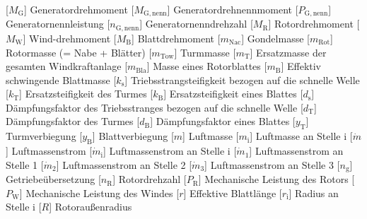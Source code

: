 \documentclass[
	pagesize,
	fontsize=12pt,
	paper=a4,
	oneside,
   reqno
]{scrartcl}
\numberwithin{equation}{section} %
\numberwithin{table}{section} %
\numberwithin{figure}{section} %
\begin{document}
\begin{acronym}[Symbols]
           [$M_{\mathrm{G}}$]          {Generatordrehmoment}
       [$M_{\mathrm{G,nenn}}$]     {Generatordrehnennmoment}
           [$P_{\mathrm{G,nenn}}$]     {Generatornennleistung}
           [$n_{\mathrm{G,nenn}}$]     {Generatornenndrehzahl}
           [$M_{\mathrm{R}}$]          {Rotordrehmoment}
           [$M_{\mathrm{W}}$]          {\glqq Wind\grqq{}-drehmoment}
           [$M_{\mathrm{B}}$]          {Blattdrehmoment}
         [$m_{\mathrm{Nac}}$]        {Gondelmasse}
         [$m_{\mathrm{Rot}}$]        {Rotormasse (= Nabe + Blätter)}
         [$m_{\mathrm{Tow}}$]        {Turmmasse}
           [$m_{\mathrm{T}}$]          {Ersatzmasse der gesamten Windkraftanlage}
         [$m_{\mathrm{Bla}}$]        {Masse eines Rotorblattes}
           [$m_{\mathrm{B}}$]          {Effektiv schwingende Blattmasse}
           [$k_{\mathrm{s}}$]          {Triebsstrangsteifigkeit bezogen auf die schnelle Welle}
           [$k_{\mathrm{T}}$]          {Ersatzsteifigkeit des Turmes}
           [$k_{\mathrm{B}}$]          {Ersatzsteifigkeit eines Blattes}
           [$d_{\mathrm{s}}$]          {Dämpfungsfaktor des Triebsstranges bezogen auf die schnelle Welle}
           [$d_{\mathrm{T}}$]          {Dämpfungsfaktor des Turmes}
           [$d_{\mathrm{B}}$]          {Dämpfungsfaktor eines Blattes}
           [$y_{\mathrm{T}}$]          {Turmverbiegung}
           [$y_{\mathrm{B}}$]          {Blattverbiegung}
            [$m$]                       {Luftmasse}
           [$m_{\mathrm{i}}$]          {Luftmasse an Stelle i}
         [$\dot m$]                  {Luftmassenstrom}
        [$\dot{m}_{\mathrm{i}}$]    {Luftmassenstrom an Stelle i}
        [$\dot{m}_{\mathrm{1}}$]    {Luftmassenstrom an Stelle 1}
        [$\dot{m}_{\mathrm{2}}$]    {Luftmassenstrom an Stelle 2}
        [$\dot{m}_{\mathrm{3}}$]    {Luftmassenstrom an Stelle 3}
           [$n_{\mathrm{g}}$]          {Getriebeübersetzung}
           [$n_{\mathrm{R}}$]          {Rotordrehzahl}
           [$P_{\mathrm{R}}$]          {Mechanische Leistung des Rotors}
           [$P_{\mathrm{W}}$]          {Mechanische Leistung des Windes}
            [$r$]                       {Effektive Blattlänge}
           [$r_{\mathrm{i}}$]          {Radius an Stelle i}
            [$R$]                       {Rotoraußenradius}

\end{acronym}
\end{document}
